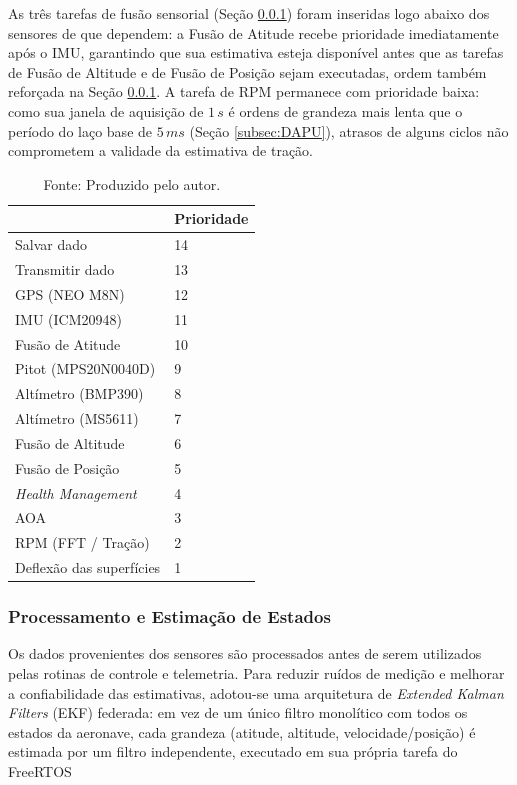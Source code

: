 As três tarefas de fusão sensorial (Seção \ref{subsec:processamentoEstimacao}) foram inseridas logo abaixo dos sensores de que dependem: a Fusão de Atitude recebe prioridade imediatamente após o IMU, garantindo que sua estimativa esteja disponível antes que as tarefas de Fusão de Altitude e de Fusão de Posição sejam executadas, ordem também reforçada na Seção \ref{subsec:processamentoEstimacao}. A tarefa de RPM permanece com prioridade baixa: como sua janela de aquisição de $1\,s$ é ordens de grandeza mais lenta que o período do laço base de $5\,ms$ (Seção \ref{subsec:DAPU}), atrasos de alguns ciclos não comprometem a validade da estimativa de tração.

\begin{table}[H]
\centering
\caption{Prioridade de cada tarefa do DAPU no RTOS.}
\begin{tabular}{|l|l|}
\hline
\rowcolor[HTML]{C0C0C0} 
\multicolumn{1}{|c|}{\textbf{Tarefa}} &
\multicolumn{1}{c|}{\textbf{Prioridade}} \\ \hline
Salvar dado & 14 \\ \hline
Transmitir dado & 13 \\ \hline
GPS (NEO M8N) & 12 \\ \hline
IMU (ICM20948) & 11 \\ \hline
Fusão de Atitude & 10 \\ \hline
Pitot (MPS20N0040D) & 9 \\ \hline
Altímetro (BMP390) & 8 \\ \hline
Altímetro (MS5611) & 7 \\ \hline
Fusão de Altitude & 6 \\ \hline
Fusão de Posição & 5 \\ \hline
\textit{Health Management} & 4 \\ \hline
AOA & 3 \\ \hline
RPM (FFT / Tração) & 2 \\ \hline
Deflexão das superfícies & 1 \\ \hline
\end{tabular}
\label{Tab:RTOSPrioridadesDAPU}
\caption*{Fonte: Produzido pelo autor.}
\end{table}

\subsubsection{Processamento e Estimação de Estados}
\label{subsec:processamentoEstimacao}

Os dados provenientes dos sensores são processados antes de serem utilizados pelas rotinas de controle e telemetria. Para reduzir ruídos de medição e melhorar a confiabilidade das estimativas, adotou-se uma arquitetura de \textit{Extended Kalman Filters} (EKF) federada: em vez de um único filtro monolítico com todos os estados da aeronave, cada grandeza (atitude, altitude, velocidade/posição) é estimada por um filtro independente, executado em sua própria tarefa do FreeRTOS

